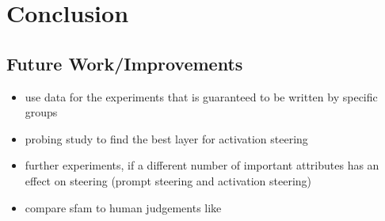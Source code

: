 \chapter{Conclusion}
\label{sec:conclusion}

\section{Future Work/Improvements} %
\begin{itemize}
  \item use data for the experiments that is guaranteed to be written by specific groups
  \item probing study to find the best layer for activation steering
  \item further experiments, if a different number of important attributes has an effect on steering (prompt steering and activation steering)
  \item compare \ac{sfam} to human judgements like \citet{patelLearningInterpretableStyle2023}
\end{itemize}

